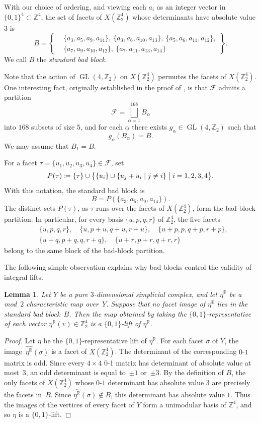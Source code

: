 \documentclass[10pt,a4paper]{amsart}
\newcommand{\Z}{\mathbb{Z}}
\newcommand{\R}{\mathbb{R}}
\newcommand{\cF}{\mathcal{F}}
\DeclareMathOperator{\GL}{GL}
\newtheorem{lemma}[theorem]{Lemma}
\begin{document}
With our choice of ordering, and viewing each $a_i$ as an integer vector in $\{0,1\}^4\subset \Z^4$, the set of facets of $X(\Z_2^4)$ whose determinants have absolute value $3$ is
$$
    B= \left\{
        \begin{aligned}
            &\{a_3,a_5,a_9,a_{14}\},\ \{a_3,a_6,a_{10},a_{13}\},\ \{a_5,a_6,a_{11},a_{12}\},\\
            &\{a_7,a_9,a_{10},a_{12}\},\ \{a_7,a_{11},a_{13},a_{14}\}
        \end{aligned}
    \right\}.
$$
We call $B$ the \emph{standard bad block}.

Note that the action of $\GL(4,\Z_2)$ on $X(\Z_2^4)$ permutes the facets of $X(\Z_2^4)$.
One interesting fact, originally established in the proof of \cite[Theorem~6.1]{Choi-Jang-Vallee2025JLMS}, is that $\cF$ admits a partition
$$
    \cF=\bigsqcup_{\alpha=1}^{168} B_\alpha
$$
into $168$ subsets of size $5$, and for each $\alpha$ there exists $g_\alpha\in \GL(4,\Z_2)$ such that
$$
    g_\alpha(B_\alpha)=B.
$$
We may assume that $B_1=B$.

For a facet $\tau=\{u_1,u_2,u_3,u_4\}\in \cF$, set
$$
    P(\tau)\coloneq \{\tau\}\cup \bigl\{ \{u_i\}\cup \{u_j+u_i\mid j\neq i\} \bigm| i=1,2,3,4 \bigr\}.
$$
With this notation, the standard bad block is
$$
    B=P(\{a_3,a_5,a_9,a_{14}\}).
$$
The distinct sets $P(\tau)$, as $\tau$ runs over the facets of $X(\Z_2^4)$, form the bad-block partition.
In particular, for every basis $\{u,p,q,r\}$ of $\Z_2^4$, the five facets
\begin{align*}
    &\{u,p,q,r\},\quad \{u,p+u,q+u,r+u\},\quad  \{u+p,p,q+p,r+p\}, \\
    &\{u+q,p+q,q,r+q\},\quad \{u+r,p+r,q+r,r\}  
\end{align*}
belong to the same block of the bad-block partition.

The following simple observation explains why bad blocks control the validity of integral lifts.

\begin{lemma}\label{lem:avoid-standard-bad-block}
    Let $Y$ be a pure $3$-dimensional simplicial complex, and let $\eta^\R$ be a mod~$2$ characteristic map over~$Y$.
    Suppose that no facet image of $\eta^\R$ lies in the standard bad block~$B$.
    Then the map obtained by taking the $\{0,1\}$-representative of each vector $\eta^\R(v)\in \Z_2^4$ is a $\{0,1\}$-lift of $\eta^\R$.
\end{lemma}
\begin{proof}
    Let $\eta$ be the $\{0,1\}$-representative lift of $\eta^\R$.
    For each facet $\sigma$ of $Y$, the image~$\widehat{\eta^\R}(\sigma)$ is a facet of $X(\Z_2^4)$.
    The determinant of the corresponding $0$-$1$ matrix is odd.
    Since every $4\times4$ 0-1 matrix has determinant of absolute value at most~$3$, an odd determinant is equal to~$\pm 1$ or~$\pm 3$.
    By the definition of $B$, the only facets of $X(\Z_2^4)$ whose $0$-$1$ determinant has absolute value $3$ are precisely the facets in~$B$.
    Since $\widehat{\eta^\R}(\sigma)\notin B$, this determinant has absolute value $1$.
    Thus the images of the vertices of every facet of $Y$ form a unimodular basis of $\Z^4$, and so $\eta$ is a $\{0,1\}$-lift.
\end{proof}
\end{document}
